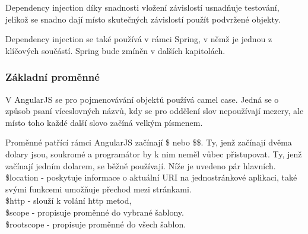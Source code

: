 \documentclass[czech,master,public,dept460,male,cpdeclaration,twoside]{diploma}
\begin{document}
Dependency injection díky snadnosti vložení závislostí usnadňuje testování, jelikož se snadno dají místo skutečných závislostí použít podvržené objekty.

Dependency injection se také používá v rámci Spring, v němž je jednou z klíčových součástí. Spring bude zmíněn v dalších kapitolách. \cite{LearningAngularjs}

\subsubsection{Základní proměnné}
V AngularJS se pro pojmenovávání objektů používá camel case. Jedná se o způsob psaní víceslovných názvů, kdy se pro oddělení slov nepoužívají mezery, ale místo toho každé další slovo začíná velkým písmenem.

Proměnné patřící rámci AngularJS začínají \$ nebo \$\$. Ty, jenž začínají dvěma dolary jsou, soukromé a programátor by k nim neměl vůbec přistupovat. Ty, jenž začínají jedním dolarem, se běžně používají. Níže je uvedeno pár hlavních.\\
\$location - poskytuje informace o aktuální URI na jednostránkové aplikaci, také svými funkcemi umožňuje přechod mezi stránkami.\\
\$http - slouží k volání http metod,\\
\$scope - propisuje proměnné do vybrané šablony.\\
\$rootscope - propisuje proměnné do všech šablon.
\end{document}
